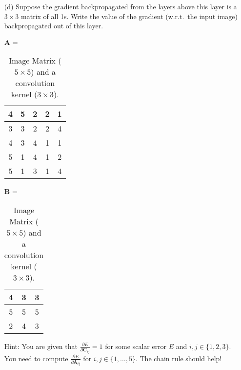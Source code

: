 \documentclass[12pt,letterpaper]{article}
\newcommand{\matr}[1]{\bm{#1}}     %
\begin{document}
\begin{itemize}
    \item[(d)] Suppose the gradient backpropagated from the layers above this layer is a $3\times 3$ matrix of all 1s. Write the value of the gradient (w.r.t.~the input image) backpropagated out of this layer.
    
    \begin{table}[!ht]
    \centering
    $\matr{A}$ =  \begin{tabular}{|c|c|c|c|c|} 
    \hline
       4 & 5 & 2 & 2 & 1 \\ \hline 
       3 & 3 & 2 & 2 & 4 \\ \hline
       4 & 3 & 4 & 1 & 1 \\ \hline 
       5 & 1 & 4 & 1 & 2 \\ \hline
       5 & 1 & 3 & 1 & 4 \\ \hline
    \end{tabular}\hspace{1cm}
    $\matr{B}$ = \begin{tabular}{|c|c|c|} 
    \hline
       4 & 3 & 3 \\ \hline 
       5 & 5 & 5 \\ \hline
       2 & 4 & 3 \\ \hline 
    \end{tabular}
    \caption{Image Matrix ($5\times 5$) and a convolution kernel ($3\times 3$).}
    \label{tab1}
   
\end{table}
 Hint: You are given that $\frac{\partial E}{\partial \matr{C}_{ij}} = 1$ for some scalar error $E$ and $i,j\in\{1,2,3\}$. You need to compute $\frac{\partial E}{\partial \matr{A}_{ij}}$ for  $i,j\in\{1, \ldots, 5\}$. The chain rule should help!


\end{itemize}
\end{document}
